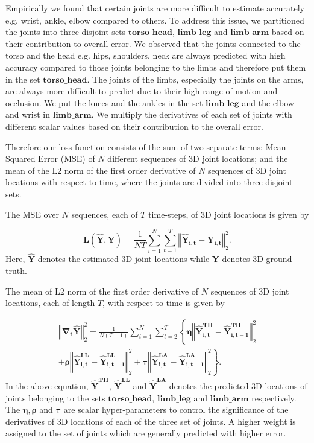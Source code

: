 \documentclass[runningheads]{llncs}
\begin{document}
Empirically we found that certain joints are  more difficult to estimate accurately e.g. wrist, ankle, elbow compared to others. To address this issue, we partitioned the joints into three disjoint sets $\mathbf{torso\_head}$, $\mathbf{limb\_leg}$ and $\mathbf{limb\_arm}$ based on their contribution to overall error. We observed that the joints connected to the torso and the head e.g. hips, shoulders, neck are always predicted with high accuracy compared to those joints belonging to the limbs and therefore put them in the set $\mathbf{torso\_head}$. The joints of the limbs, especially the joints on the arms, are always more difficult to predict due to their high range of motion and occlusion. We put the knees and the ankles in the set $\mathbf{limb\_leg}$  and the elbow and wrist in $\mathbf{limb\_arm}$. We multiply the derivatives of each set of joints with different scalar values based on their contribution to the overall error.

Therefore our loss function consists of the sum of two separate terms: Mean Squared Error (MSE) of $N$ different sequences of 3D joint locations; and the mean of the L2 norm of the first order derivative of $N$ sequences of 3D joint locations with respect to time, where the joints are divided into three disjoint sets.

The MSE over $N$ sequences, each of $T$ time-steps, of 3D joint locations is given by 

\begin{equation}
\mathcal{\mathbf{L}}(\mathbf{\hat{Y}},\mathbf{Y}) = \frac{1}{NT}\sum_{i=1}^{N}\sum_{t=1}^{T}\left\Vert \mathbf{\hat{Y}_{i,t}} -  \mathbf{{Y}_{i,t}}  \right\Vert^{2}_2. 
\end{equation} Here, $\mathbf{\hat{Y}}$ denotes the estimated 3D joint locations while $\mathbf{Y}$ denotes 3D ground truth. 

The mean of L2 norm of the first order derivative of $N$ sequences of 3D joint locations, each of length $T$, with respect to time is given by

\begin{multline}
\left\Vert\mathbf{\nabla_{t}}\mathbf{\hat{Y}} \right\Vert^{2}_2 = \frac{1}{N(T-1)}  \sum_{i=1}^{N}\sum_{t=2}^{T}\left\{\mathbf{\eta}\left\Vert \mathbf{\hat{Y}_{i,t}^{TH}} -  \mathbf{\hat{Y}_{i,t-1}^{TH}}  \right\Vert^{2}_2 \right. \\ + \mathbf{\rho} \left\Vert \mathbf{\hat{Y}_{i,t}^{LL}} -  \mathbf{\hat{Y}_{i,t-1}^{LL}}  \right\Vert^{2}_2 + \left. \mathbf{\tau}  \left\Vert \mathbf{\hat{Y}_{i,t}^{LA}} -  \mathbf{\hat{Y}_{i,t-1}^{LA}}  \right\Vert^{2}_2 \right\}.
\end{multline} In the above equation, $\mathbf{\hat{Y}^{TH}}$, $\mathbf{\hat{Y}^{LL}}$ and $\mathbf{\hat{Y}^{LA}}$ denotes the predicted 3D locations of joints belonging to the sets $\mathbf{torso\_head}$, $\mathbf{limb\_leg}$ and $\mathbf{limb\_arm}$ respectively. The $\mathbf{\eta}, \mathbf{\rho}$ and $\mathbf{\tau}$ are scalar hyper-parameters to control the significance of the derivatives of 3D locations of each of the three set of joints. A higher weight is assigned to the set of joints which are generally predicted with higher error.  
\end{document}
